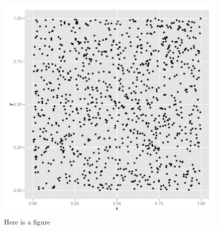 \documentclass[11pt]{article}
\begin{document}
\begin{figure}[h]
  \begin{center}
  \caption{Here is a figure} \label{fig:hist}
  \includegraphics[scale=0.25]{plots/hist.pdf}
  \end{center} 
\end{figure}



\end{document}
